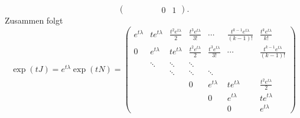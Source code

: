 \begin{anwendung}
\[\begin{pmatrix}
			  &        &               &                &                & 0                      & 1
		\end{pmatrix}.
	\]
	Zusammen folgt
	\[
		\exp(tJ) = e^{t\lambda} \exp(tN) =
		\begin{pmatrix}
			e^{t\lambda} & te^{t\lambda} & \frac{t^2e^{t\lambda}}{2} & \frac{t^3e^{t\lambda}}{3!} & \cdots                     & \frac{t^{k-1}e^{t\lambda}}{(k-1)!} & \frac{t^{k}e^{t\lambda}}{k!}       \\
			0            & e^{t\lambda}  & te^{t\lambda}             & \frac{t^2e^{t\lambda}}{2}  & \frac{t^3e^{t\lambda}}{3!} & \cdots                             & \frac{t^{k-1}e^{t\lambda}}{(k-1)!} \\
			             & \ddots        & \ddots                    & \ddots                     &                            &                                    &  \\
			             &               & \ddots                    & \ddots                     & \ddots                     &                                    &  \\
			             &               &                           & 0                          & e^{t\lambda}               & te^{t\lambda}                      & \frac{t^2e^{t\lambda}}{2}          \\
			             &               &                           &                            & 0                          & e^{t\lambda}                       & te^{t\lambda}                      \\
			             &               &                           &                            &                            & 0                                  & e^{t\lambda}
		\end{pmatrix}
	\]
\end{anwendung}
\newpage
